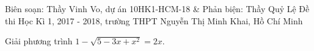 \begin{name}
{Biên soạn: Thầy Vinh Vo, dự án 10HK1-HCM-18 \& Phản biện: Thầy Quỷ Lệ}
{Đề thi Học Kì 1, 2017 - 2018, trường THPT Nguyễn Thị Minh Khai, Hồ Chí Minh}
\end{name}

\setcounter{bt}{0}

\begin{bt}%
	Giải phương trình $ 1 - \sqrt{5 -3x + x^2} = 2x $.
\end{bt}	
